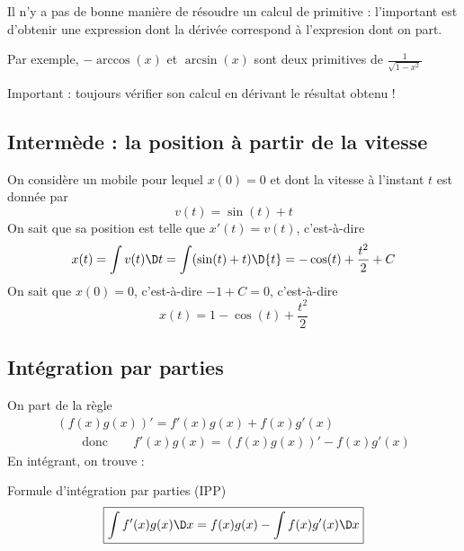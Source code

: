 \begin{frame}
  \begin{remark*}
    Il n'y a pas de \og bonne manière\fg{} de résoudre un calcul de primitive\pause{} : l'important est d'obtenir une expression dont la dérivée correspond à l'expresion dont on part.
  \end{remark*}
  \begin{example}\pause{}
     Par exemple, \(-\arccos(x)\) et \(\arcsin(x)\) sont deux primitives de \(\frac{1}{\sqrt{1-x^{2}}}\)
  \end{example}\pause{}
  \begin{remark*}
    Important : toujours vérifier son calcul en dérivant le résultat obtenu !
  \end{remark*}
\end{frame}

\subsection{Intermède : la position à partir de la vitesse}
\begin{frame}
  On considère un mobile pour lequel \(x(0) = 0\)\pause{} et dont la vitesse à l'instant \(t\) est donnée par\pause{}
  \begin{equation*}
    v(t) = \sin(t) + t
  \end{equation*}\pause{}
  On sait que sa position est telle que \(x'(t) = v(t)\), c'est-à-dire\pause{}
  \begin{equation*}
    x(t) = \int v(t)\D t = \int (\sin(t) + t) \D{t} = - \cos(t) + \frac{t^{2}}{2} + C
  \end{equation*}\pause{}
  On sait que \(x(0) = 0\), c'est-à-dire \(-1 + C = 0\), c'est-à-dire\pause{}
  \begin{equation*}
    x(t) = 1 - \cos(t) + \frac{t^{2}}{2}
  \end{equation*}
\end{frame}

\subsection{Intégration par parties}
\begin{frame}
  On part de la règle
  \begin{align*}
    (f(x)g(x))' = f'(x) g(x) + f(x) g'(x)\\
    \qquad
    \textrm{donc}
    \qquad
    f'(x) g(x) = (f(x)g(x))' - f(x) g'(x)
  \end{align*}\pause
  En intégrant, on trouve :\pause
  \begin{block}{Formule d'intégration par parties (IPP)}
  \begin{equation*}
    \boxed{\int f'(x) g(x)\D x = f(x)g(x) - \int f(x)g'(x)\D x}
  \end{equation*}
\end{block}
\end{frame}

